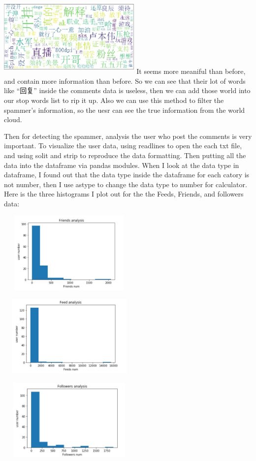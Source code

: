 \documentclass[sigconf]{acmart}
\begin{document}
\includegraphics[width=7cm, height=4cm]{3.jpg}
It seems more meaniful than before, and contain more information than before. So we can see that their lot of words like ``回复'' inside the comments data is useless, then we can add those world into our stop words list to rip it up. Also we can use this method to filter the spammer's information, so the uesr can see the true information from the world cloud.

Then for detecting the spammer, analysis the user who post the comments is very important. To visualize the user data, using readlines to open the each txt file, and using solit and strip to reproduce the data formatting. Then putting all the data into the dataframe via pandas modules. When I look at the data type in dataframe, I found out that the data type inside the dataframe for each catory is not number, then I use astype to change the data type to number for calculator. Here is the three histograms I plot out for the the Feeds, Friends, and followers data: 

\includegraphics[width=7cm, height=4cm]{4.jpg}

\includegraphics[width=7cm, height=4cm]{5.jpg}

\includegraphics[width=7cm, height=4cm]{6.jpg}
\end{document}
